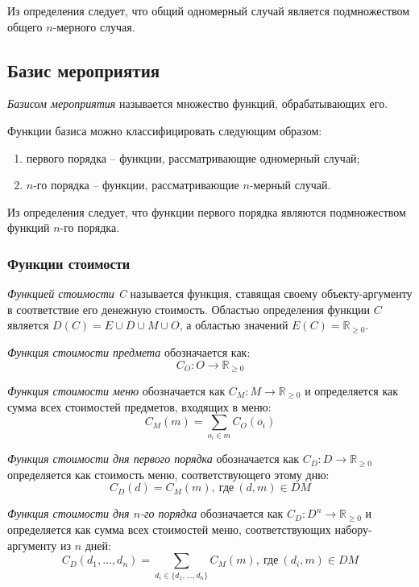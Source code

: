Из определения следует, что общий одномерный случай является подмножеством общего $n$-мерного случая.

\subsection{Базис мероприятия}

\textit{Базисом мероприятия} называется множество функций, обрабатывающих его.

Функции базиса можно классифицировать следующим образом:
\begin{enumerate}
	\item первого порядка -- функции, рассматривающие одномерный случай;
	\item $n$-го порядка -- функции, рассматривающие $n$-мерный случай.
\end{enumerate}

Из определения следует, что функции первого порядка являются подмножеством функций $n$-го порядка.

\subsubsection{Функции стоимости}

\textit{Функцией стоимости C} называется функция, ставящая своему объекту-аргументу в соответствие его денежную стоимость. Областью определения функции $C$ является $D(C) = E \cup D \cup M \cup O$, а областью значений $E(C) = \mathbb{R}_{\ge 0}$.

\textit{Функция стоимости предмета} обозначается как:
\begin{equation}
	C_O: O \rightarrow \mathbb{R}_{\ge 0}
\end{equation}

\textit{Функция стоимости меню} обозначается как $C_M: M \rightarrow \mathbb{R}_{\ge 0}$ и определяется как сумма всех стоимостей предметов, входящих в меню:
\begin{equation}
	C_M(m) = \sum_{o_i \in m} C_O(o_i)
\end{equation}

\textit{Функция стоимости дня первого порядка} обозначается как \newline $C_D: D \rightarrow \mathbb{R}_{\ge 0}$ определяется как стоимость меню, соответствующего этому дню:
\begin{equation}
	C_D(d) = C_M(m), \ \text{где} \ (d, m) \in DM
\end{equation}

\textit{Функция стоимости дня $n$-го порядка} обозначается как $C_D: D^n \rightarrow \mathbb{R}_{\ge 0}$ \newline и определяется как сумма всех стоимостей меню, соответствующих \newline набору-аргументу из $n$ дней:
\begin{equation}
	C_D(d_1, \dots, d_n) = \sum_{d_i \in \{d_1, \dots, d_n\}}{C_M(m)}, \ \text{где} \ (d_i, m) \in DM
\end{equation}

